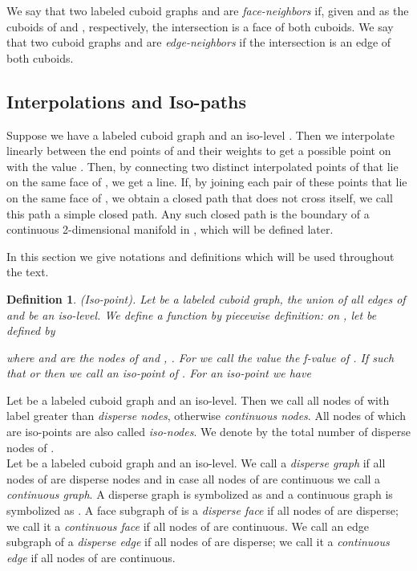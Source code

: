 \documentclass[a4paper,11pt]{article}
\newtheorem{definition}[theorem]{Definition}
\begin{document}
We say that two labeled cuboid graphs  and
 are {\it face-neighbors} if, given  and  as the cuboids of  and
, respectively, the intersection  is a face of both cuboids. We say that two cuboid graphs
 and  are {\it edge-neighbors} if the intersection  is an edge of both cuboids.

\subsection{Interpolations and Iso-paths}
Suppose we have a labeled cuboid graph  and an iso-level . Then we
interpolate linearly between the end points of  and their weights to get a possible point on 
with the value . Then, by connecting two distinct interpolated points of  that lie on the same face
of , we get a line. If, by joining each pair of these points that lie on the same face of , we obtain
a closed path that does not cross itself, we call this path a simple closed path. Any such closed path
is the boundary of a continuous 2-dimensional manifold in , which will be defined later.

In this section we give notations and definitions which will be used throughout the text.
\begin{definition}(Iso-point). Let  be a labeled cuboid graph, 
the union of all edges of  and  be an iso-level. We define a function
 by piecewise definition:  on , let  be defined by

where  and  are the nodes of  and , .
For  we call the value  the f-value of . If  such that  or
 then we call  an {\it iso-point} of . For an iso-point  we have

\label{def:labeled-graph-5}
\end{definition}

Let  be a labeled cuboid
graph and  an iso-level. Then we call all nodes of  with label greater than  {\it disperse nodes},
otherwise {\it continuous nodes}. All nodes of  which are iso-points are also called {\it iso-nodes}. We denote
by  the total number of disperse nodes of . \\

Let  be a labeled cuboid graph and
 an iso-level. We call  a {\it disperse graph} if all nodes of  are disperse nodes and in case
all nodes of  are continuous we call  a {\it continuous graph}. A disperse graph  is symbolized as
 and a continuous graph  is symbolized as . A face subgraph  of
 is a {\it disperse face} if all nodes of  are disperse; we call it a {\it continuous face} if all nodes of
 are continuous. We call an edge subgraph  of  a {\it disperse edge} if all nodes of
 are disperse; we call it a {\it continuous edge} if all nodes of  are continuous.\\
\end{document}
